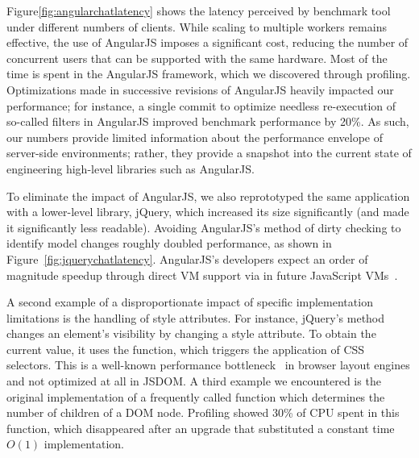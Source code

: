 Figure\ref{fig:angularchatlatency} shows the latency perceived by benchmark tool
under different numbers of clients. While scaling to multiple workers remains effective,
the use of AngularJS imposes a significant cost, reducing the number of concurrent users 
that can be supported with the same hardware.  Most of the time is spent in the AngularJS
framework, which we discovered through profiling.  Optimizations made in successive revisions
of AngularJS heavily impacted our performance; for instance, a single commit to optimize
needless re-execution of so-called filters in AngularJS improved benchmark performance by 20\%.
As such, our numbers provide limited information about the performance envelope of
server-side environments; rather, they provide a snapshot into the current state of
engineering high-level libraries such as AngularJS.  

\jquerychatlatency{}
To eliminate the impact of AngularJS, we also reprototyped the same application with a
lower-level library, jQuery, which increased its size significantly (and made it significantly
less readable).  Avoiding AngularJS's method of dirty checking to identify model changes
roughly doubled performance, as shown in Figure~\ref{fig:jquerychatlatency}.
AngularJS's developers expect an order of magnitude speedup through direct VM 
support via  in future JavaScript VMs~\cite{angularjsspeedup}.

A second example of a disproportionate impact of specific implementation limitations
is the handling of style attributes.  For instance, jQuery's  method changes an element's
visibility by changing a style attribute.  To obtain the current value, it uses the
 function, which triggers the application of CSS selectors.
This is a well-known performance bottleneck~\cite{Meyerovich+:WWW2010} in browser
layout engines and not optimized at all in JSDOM.  A third example we encountered 
is the original implementation of a frequently called function 
which determines the number of children of a DOM node.  Profiling showed 30\% of CPU
spent in this function, which disappeared after an upgrade that substituted a
constant time $O(1)$ implementation.
